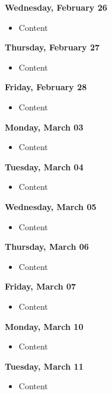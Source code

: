 \documentclass{article}
\begin{document}
\textbf{Wednesday, February 26}

\begin{itemize}
\item Content
\end{itemize}

\textbf{Thursday, February 27}

\begin{itemize}
\item Content
\end{itemize}

\textbf{Friday, February 28}

\begin{itemize}
\item Content
\end{itemize}

\textbf{Monday, March 03}

\begin{itemize}
\item Content
\end{itemize}

\textbf{Tuesday, March 04}

\begin{itemize}
\item Content
\end{itemize}

\textbf{Wednesday, March 05}

\begin{itemize}
\item Content
\end{itemize}

\textbf{Thursday, March 06}

\begin{itemize}
\item Content
\end{itemize}

\textbf{Friday, March 07}

\begin{itemize}
\item Content
\end{itemize}

\textbf{Monday, March 10}

\begin{itemize}
\item Content
\end{itemize}

\textbf{Tuesday, March 11}

\begin{itemize}
\item Content
\end{itemize}
\end{document}
